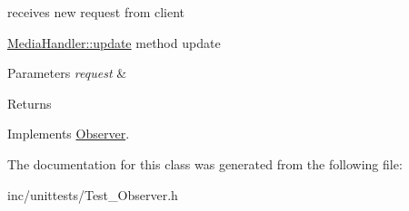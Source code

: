 receives new request from client 

\hyperlink{classMediaHandler_ae0c5fa9c02ac287d2e04699d67a02eaf}{Media\+Handler\+::update} method update 
\begin{DoxyParams}{Parameters}
{\em request} & \\
\hline
\end{DoxyParams}
\begin{DoxyReturn}{Returns}

\end{DoxyReturn}


Implements \hyperlink{classObserver_acc79119027d8770fe4946161d6274a00}{Observer}.



The documentation for this class was generated from the following file\+:\begin{DoxyCompactItemize}
\item 
inc/unittests/Test\+\_\+\+Observer.\+h\end{DoxyCompactItemize}
